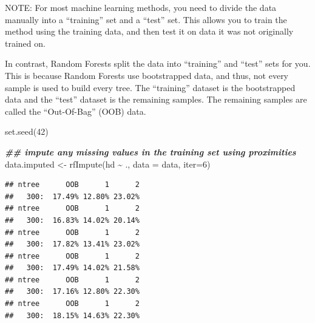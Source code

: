 \documentclass[
]{book}
\newenvironment{Shaded}{\begin{snugshade}}{\end{snugshade}}
\newcommand{\AttributeTok}[1]{\textcolor[rgb]{0.77,0.63,0.00}{#1}}
\newcommand{\DecValTok}[1]{\textcolor[rgb]{0.00,0.00,0.81}{#1}}
\newcommand{\DocumentationTok}[1]{\textcolor[rgb]{0.56,0.35,0.01}{\textbf{\textit{#1}}}}
\newcommand{\FunctionTok}[1]{\textcolor[rgb]{0.00,0.00,0.00}{#1}}
\newcommand{\NormalTok}[1]{#1}
\newcommand{\OtherTok}[1]{\textcolor[rgb]{0.56,0.35,0.01}{#1}}
\newcommand{\SpecialCharTok}[1]{\textcolor[rgb]{0.00,0.00,0.00}{#1}}
\begin{document}
NOTE: For most machine learning methods, you need to divide the data manually into a ``training'' set and a ``test'' set. This allows you to train the method using the training data, and then test it on data it was not originally trained on.

In contrast, Random Forests split the data into ``training'' and ``test'' sets for you. This is because Random Forests use bootstrapped data, and thus, not every sample is used to build every tree. The ``training'' dataset is the bootstrapped data and the ``test'' dataset is the remaining samples. The remaining samples are called the ``Out-Of-Bag'' (OOB) data.

\begin{Shaded}
\begin{Highlighting}[]
\FunctionTok{set.seed}\NormalTok{(}\DecValTok{42}\NormalTok{)}

\DocumentationTok{\#\# impute any missing values in the training set using proximities}
\NormalTok{data.imputed }\OtherTok{\textless{}{-}} \FunctionTok{rfImpute}\NormalTok{(hd }\SpecialCharTok{\textasciitilde{}}\NormalTok{ ., }\AttributeTok{data =}\NormalTok{ data, }\AttributeTok{iter=}\DecValTok{6}\NormalTok{)}
\end{Highlighting}
\end{Shaded}

\begin{verbatim}
## ntree      OOB      1      2
##   300:  17.49% 12.80% 23.02%
## ntree      OOB      1      2
##   300:  16.83% 14.02% 20.14%
## ntree      OOB      1      2
##   300:  17.82% 13.41% 23.02%
## ntree      OOB      1      2
##   300:  17.49% 14.02% 21.58%
## ntree      OOB      1      2
##   300:  17.16% 12.80% 22.30%
## ntree      OOB      1      2
##   300:  18.15% 14.63% 22.30%
\end{verbatim}
\end{document}
